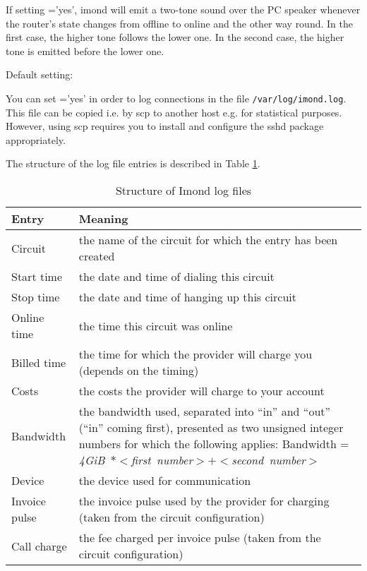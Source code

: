 \begin{description}

    {If setting ='yes', imond will emit a two-tone sound
      over the PC speaker whenever the router's state changes from offline to
      online and the other way round. In the first case, the higher tone
      follows the lower one. In the second case, the higher tone is emitted
      before the lower one.}



     Default setting: 
    
    {You can set ='yes' in order to log connections in the
      file \verb+/var/log/imond.log+. This file can be copied i.e. by scp to
      another host e.g. for statistical purposes. However, using scp requires
      you to install and configure the sshd package appropriately.

      The structure of the log file entries is described in Table \ref{tab:imondlog}.
      \begin{table}[htbp]
        \small
        \centering
        \caption{Structure of Imond log files}\label{tab:imondlog}
        \begin{tabular}{lp{12cm}}
          \hline
          Entry & Meaning \\
          \hline
          Circuit & the name of the circuit for which the entry has been created \\
          Start time & the date and time of dialing this circuit \\
          Stop time & the date and time of hanging up this circuit \\
          Online time & the time this circuit was online \\
          Billed time & the time for which the provider will charge you (depends on
          the timing) \\
          Costs & the costs the provider will charge to your account \\
          Bandwidth & the bandwidth used, separated into ``in'' and ``out''
          (``in'' coming first), presented as two unsigned integer numbers
          for which the following applies: Bandwidth =\newline
          \emph{4GiB~$*<$first~number$>+<$second~number$>$} \\
          Device & the device used for communication \\
          Invoice pulse & the invoice pulse used by the provider for charging
          (taken from the circuit configuration)\\
          Call charge & the fee charged per invoice pulse (taken from the
          circuit configuration)\\
          \hline
        \end{tabular}
      \end{table}

}
\end{description}
